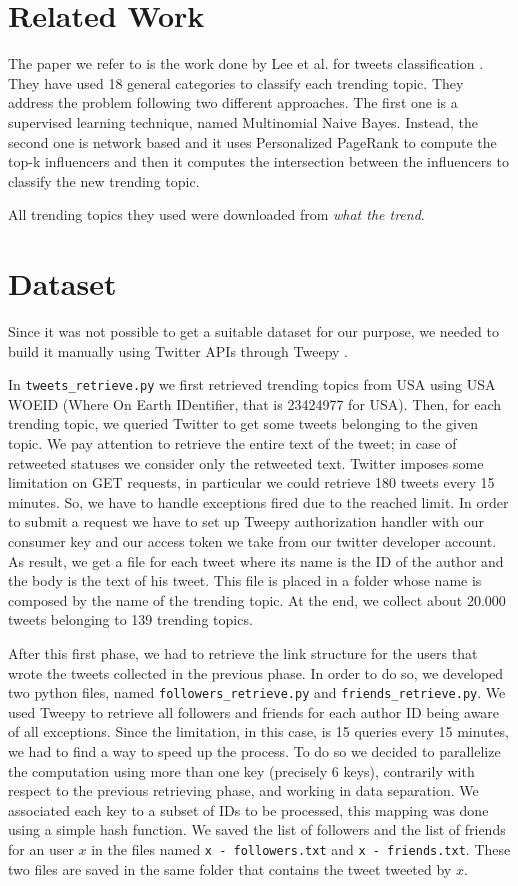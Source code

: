 \documentclass[journal,11pt]{vgtc}
\begin{document}
\section{Related Work}
The paper we refer to is the work done by Lee et al. for tweets classification \cite{lee_palsetia_narayanan_patwary_agrawal_choudhary_2011}.
They have used 18 general categories to classify each trending topic.
They address the problem following two different approaches. The first one is a supervised learning technique, named
Multinomial Naive Bayes. Instead, the second one is network based and it uses Personalized PageRank to compute the
top-k influencers and then it computes the intersection between the influencers to classify the new trending topic.

All trending topics they used were downloaded from \textit{what the trend}.

\section{Dataset}
Since it was not possible to get a suitable dataset for our purpose, we needed to build it manually
using Twitter APIs \cite{twitter} through Tweepy \cite{api}.

In \texttt{tweets\_retrieve.py} we
first retrieved trending topics from USA using USA WOEID (Where On Earth IDentifier, that is 23424977 for USA).
Then, for each trending topic, we queried Twitter to get some tweets belonging to the given topic.
We pay attention to retrieve the entire text of the tweet; in case of retweeted statuses we consider only the
retweeted text.
Twitter imposes some limitation on GET requests, in particular we could retrieve 180 tweets every 15 minutes.
So, we have to handle exceptions fired due to the reached limit.
In order to submit a request we have to set up Tweepy authorization handler with our
consumer key and our access token we take from our twitter developer account.
As result, we get a file for each tweet where its name is the ID of the author and the body is the text of his tweet.
This file is placed in a folder whose name is composed by the name of the trending topic.
At the end, we collect about 20.000 tweets belonging to 139 trending topics.

After this first phase, we had to retrieve the link structure for the users that wrote the tweets collected
in the previous phase. In order to do so, we developed two python files, named \texttt{followers\_retrieve.py} and
\texttt{friends\_retrieve.py}.
We used Tweepy to retrieve all followers and friends for each author ID being aware of all exceptions.
Since the limitation, in this case, is 15 queries every 15 minutes, we had to find a way to speed up the process.
To do so we decided to parallelize the computation using more than one key (precisely 6 keys), contrarily with respect to the previous
retrieving phase, and working in data separation. We associated each key to a subset of IDs to be processed, this
mapping was done using a simple hash function.
We saved the list of followers and the list of friends for an user $x$ in the files named \texttt{x - followers.txt}
and \texttt{x - friends.txt}. These two files are saved in the same folder that contains the tweet tweeted by $x$.
\end{document}
